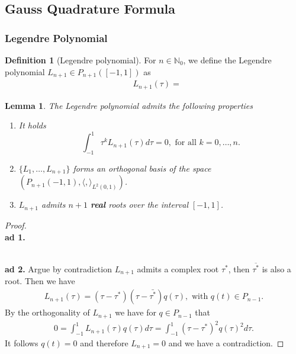 \documentclass[a4paper,12pt,oneside,fleqn]{book}
\newtheorem{lemma}[theorem]{Lemma}
\theoremstyle{definition}
\newtheorem{definition}{Definition}[section]
\theoremstyle{remark}
\begin{document}
\subsection{Gauss Quadrature Formula}
\subsubsection{Legendre Polynomial}
\begin{definition}[Legendre polynomial]
	For $n \in \mathbb{N}_0$, we define the Legendre polynomial $L_{n + 1} \in P_{n + 1}([-1, 1])$ as  
	\begin{equation}
	\begin{aligned}
		& L_{n + 1}(\tau) = 
	\end{aligned}
	\end{equation}
\end{definition}

\begin{lemma}
	The Legendre polynomial admits the following properties
	\begin{enumerate}
		\item It holds
		\begin{equation}
			\int_{-1}^1 \tau^k L_{n + 1}(\tau) d\tau = 0, \text{ for all } k = 0, \dots, n.  
		\end{equation}
		\item $\{L_1, \dots, L_{n+1}\}$ forms an orthogonal basis of the space $(P_{n + 1}(-1, 1), \langle, \rangle_{L^2(0, 1)})$.  
		\item $L_{n + 1}$ admits $n +1$ \textbf{real} roots over the interval $[-1, 1]$. 
	\end{enumerate}
\end{lemma}
\begin{proof}
\quad\\
\textbf{ad 1.}


\quad\\
\textbf{ad 2.} Argue by contradiction $L_{n + 1}$ admits a complex root $\tau^*$, then $\overline{\tau^*}$ is also a root. Then we have 
\begin{align*}
	L_{n + 1}(\tau) = (\tau - \tau^*)(\tau - \bar{\tau^*})q(\tau), \text{ with } q(t) \in P_{n -1}.
\end{align*}
By the orthogonality of $L_{n + 1}$ we have for $q \in P_{n - 1}$ that
\begin{align*}
	0 = \int_{-1}^1 L_{n+1}(\tau) q(\tau) d\tau = \int_{-1}^1 (\tau - \tau^*)^2 q(\tau)^2 d\tau.
\end{align*}
It follows $q(t) = 0$ and therefore $L_{n + 1} =0$ and we have a contradiction. 
\end{proof}
\end{document}
